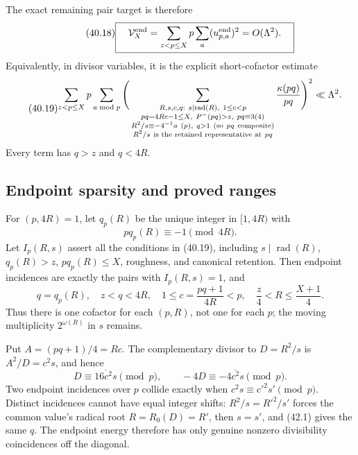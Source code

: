 \documentclass[10pt,reqno]{amsart}
\theoremstyle{definition}
\newcommand{\rad}{\operatorname {rad}}
\newcommand{\1}{\mathbf 1}
\begin{document}
The exact remaining pair target is therefore
\begin{equation}\tag{40.18}
 \boxed{\quad \mathcal V_X^{\rm end}
 =\sum_{z<p\leq X}p\sum_a(u^{\rm end}_{p,a})^2
 =O(\Lambda^2).\quad}
\end{equation}
Equivalently, in divisor variables, it is the explicit short-cofactor
estimate
\begin{equation}\tag{40.19}
\begin{aligned}
 \sum_{z<p\leq X}p\sum_{a\bmod p}
 \Bigg(&\sum_{\substack{R,s,c,q:\ s\mid\rad(R),\ 1\leq c<p\\
       pq=4Rc-1\leq X,\ P^-(pq)>z,\ pq\equiv3(4)\\
       R^2/s\equiv-4^{-1}a\ (p),\ q>1\ ({\rm so}\ pq\ \text{composite})\\
       R^2/s\ \text{is\ the\ retained\ representative\ at}\ pq}}
       \frac{\kappa(pq)}{pq}\Bigg)^2
 \ll\Lambda^2.
\end{aligned}
\end{equation}
Every term has $q>z$ and $q<4R$.

\subsection{Endpoint sparsity and proved ranges}
For $(p,4R)=1$, let $q_p(R)$ be the unique integer in $[1,4R)$ with
\begin{equation}\tag{42.1}
                         pq_p(R)\equiv-1\pmod{4R}.
\end{equation}
Let $I_p(R,s)$ assert all the conditions in (40.19), including
$s\mid\rad(R)$, $q_p(R)>z$, $pq_p(R)\leq X$, roughness, and canonical
retention.  Then endpoint incidences are exactly the pairs with
$I_p(R,s)=1$, and
\begin{equation}\tag{42.2}
 q=q_p(R),\quad z<q<4R,\quad 1\leq c=\frac{pq+1}{4R}<p,
 \quad \frac z4<R\leq\frac{X+1}4.
\end{equation}
Thus there is one cofactor for each $(p,R)$, not one for each $p$; the
moving multiplicity $2^{\omega(R)}$ in $s$ remains.

Put $A=(pq+1)/4=Rc$.  The complementary divisor to $D=R^2/s$ is
$A^2/D=c^2s$, and hence
\begin{equation}\tag{42.3}
 D\equiv\overline{16c^2s}\pmod p,
 \qquad -4D\equiv-\overline{4c^2s}\pmod p.
\end{equation}
Two endpoint incidences over $p$ collide exactly when
$c^2s\equiv c'^2s'\pmod p$.  Distinct incidences cannot have equal integer
shifts: $R^2/s=R'^2/s'$ forces the common value's radical root
$R=R_0(D)=R'$, then $s=s'$, and (42.1) gives the same $q$.  The endpoint
energy therefore has only genuine nonzero divisibility coincidences off the
diagonal.
\end{document}
